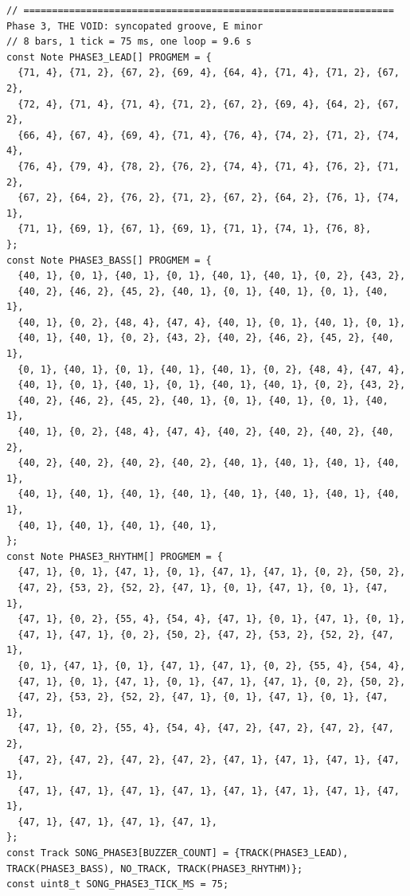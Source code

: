 \documentclass[11pt,a4paper]{article}
\begin{document}
\begin{lstlisting}[language=Arduino]
// ================================================================= Phase 3, THE VOID: syncopated groove, E minor
// 8 bars, 1 tick = 75 ms, one loop = 9.6 s
const Note PHASE3_LEAD[] PROGMEM = {
  {71, 4}, {71, 2}, {67, 2}, {69, 4}, {64, 4}, {71, 4}, {71, 2}, {67, 2},
  {72, 4}, {71, 4}, {71, 4}, {71, 2}, {67, 2}, {69, 4}, {64, 2}, {67, 2},
  {66, 4}, {67, 4}, {69, 4}, {71, 4}, {76, 4}, {74, 2}, {71, 2}, {74, 4},
  {76, 4}, {79, 4}, {78, 2}, {76, 2}, {74, 4}, {71, 4}, {76, 2}, {71, 2},
  {67, 2}, {64, 2}, {76, 2}, {71, 2}, {67, 2}, {64, 2}, {76, 1}, {74, 1},
  {71, 1}, {69, 1}, {67, 1}, {69, 1}, {71, 1}, {74, 1}, {76, 8},
};
const Note PHASE3_BASS[] PROGMEM = {
  {40, 1}, {0, 1}, {40, 1}, {0, 1}, {40, 1}, {40, 1}, {0, 2}, {43, 2},
  {40, 2}, {46, 2}, {45, 2}, {40, 1}, {0, 1}, {40, 1}, {0, 1}, {40, 1},
  {40, 1}, {0, 2}, {48, 4}, {47, 4}, {40, 1}, {0, 1}, {40, 1}, {0, 1},
  {40, 1}, {40, 1}, {0, 2}, {43, 2}, {40, 2}, {46, 2}, {45, 2}, {40, 1},
  {0, 1}, {40, 1}, {0, 1}, {40, 1}, {40, 1}, {0, 2}, {48, 4}, {47, 4},
  {40, 1}, {0, 1}, {40, 1}, {0, 1}, {40, 1}, {40, 1}, {0, 2}, {43, 2},
  {40, 2}, {46, 2}, {45, 2}, {40, 1}, {0, 1}, {40, 1}, {0, 1}, {40, 1},
  {40, 1}, {0, 2}, {48, 4}, {47, 4}, {40, 2}, {40, 2}, {40, 2}, {40, 2},
  {40, 2}, {40, 2}, {40, 2}, {40, 2}, {40, 1}, {40, 1}, {40, 1}, {40, 1},
  {40, 1}, {40, 1}, {40, 1}, {40, 1}, {40, 1}, {40, 1}, {40, 1}, {40, 1},
  {40, 1}, {40, 1}, {40, 1}, {40, 1},
};
const Note PHASE3_RHYTHM[] PROGMEM = {
  {47, 1}, {0, 1}, {47, 1}, {0, 1}, {47, 1}, {47, 1}, {0, 2}, {50, 2},
  {47, 2}, {53, 2}, {52, 2}, {47, 1}, {0, 1}, {47, 1}, {0, 1}, {47, 1},
  {47, 1}, {0, 2}, {55, 4}, {54, 4}, {47, 1}, {0, 1}, {47, 1}, {0, 1},
  {47, 1}, {47, 1}, {0, 2}, {50, 2}, {47, 2}, {53, 2}, {52, 2}, {47, 1},
  {0, 1}, {47, 1}, {0, 1}, {47, 1}, {47, 1}, {0, 2}, {55, 4}, {54, 4},
  {47, 1}, {0, 1}, {47, 1}, {0, 1}, {47, 1}, {47, 1}, {0, 2}, {50, 2},
  {47, 2}, {53, 2}, {52, 2}, {47, 1}, {0, 1}, {47, 1}, {0, 1}, {47, 1},
  {47, 1}, {0, 2}, {55, 4}, {54, 4}, {47, 2}, {47, 2}, {47, 2}, {47, 2},
  {47, 2}, {47, 2}, {47, 2}, {47, 2}, {47, 1}, {47, 1}, {47, 1}, {47, 1},
  {47, 1}, {47, 1}, {47, 1}, {47, 1}, {47, 1}, {47, 1}, {47, 1}, {47, 1},
  {47, 1}, {47, 1}, {47, 1}, {47, 1},
};
const Track SONG_PHASE3[BUZZER_COUNT] = {TRACK(PHASE3_LEAD), TRACK(PHASE3_BASS), NO_TRACK, TRACK(PHASE3_RHYTHM)};
const uint8_t SONG_PHASE3_TICK_MS = 75;


\end{lstlisting}
\end{document}
